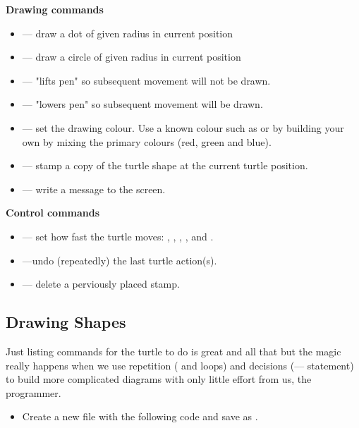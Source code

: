 \documentclass{coderdojo}
\begin{document}
\begin{itemize}
{\bfseries\color{section} Drawing commands}
\begin{itemize}
\item {} --- draw a dot of given radius in current position
\item {} --- draw a circle of given radius in current position
\item {} --- "lifts pen" so subsequent movement will not be drawn.
\item {} --- "lowers pen" so subsequent movement will be drawn.
\item {} --- set the drawing colour. Use a known colour such as  or by building your own by mixing the primary colours (red, green and blue).
\item {} --- stamp a copy of the turtle shape at the current turtle position.
\item {} --- write a message to the screen.
\end{itemize}
{\bfseries\color{section} Control commands}
\begin{itemize}
\item {} --- set how fast the turtle moves:  , , , , and  .
\item {} ---undo (repeatedly) the last turtle action(s).
\item {} --- delete a perviously placed stamp.
\end{itemize}
\end{itemize}

\subsection{Drawing Shapes}

Just listing commands for the turtle to do is great and all that but the magic really happens when we use repetition  ( and  loops) and decisions (---- statement) to build more complicated diagrams with only little effort from us, the programmer.


\begin{itemize}
\item[\todoSymbol] \color{todo}
Create a new file with the following code and save as .
\end{itemize}
\end{document}
